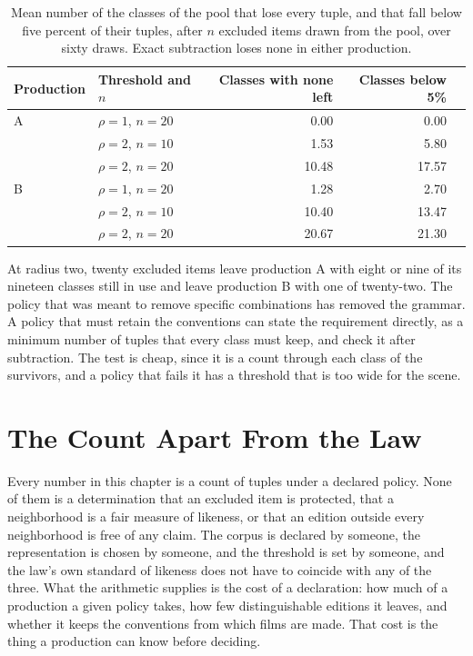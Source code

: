 \documentclass[11pt,twoside,openright]{book}
\theoremstyle{plain}
\theoremstyle{definition}
\theoremstyle{remark}
\begin{document}
\begin{table}[ht]
\centering
\begin{tabular}{@{}llrrr@{}}
\toprule
Production & Threshold and $n$ & Classes with none left & Classes below 5\%\\
\midrule
A & $\rho=1$, $n=20$ & 0.00 & 0.00\\
 & $\rho=2$, $n=10$ & 1.53 & 5.80\\
 & $\rho=2$, $n=20$ & 10.48 & 17.57\\
\midrule
B & $\rho=1$, $n=20$ & 1.28 & 2.70\\
 & $\rho=2$, $n=10$ & 10.40 & 13.47\\
 & $\rho=2$, $n=20$ & 20.67 & 21.30\\
\bottomrule
\end{tabular}
\caption{Mean number of the classes of the pool that lose every tuple, and that fall below five percent of their tuples, after $n$ excluded items drawn from the pool, over sixty draws. Exact subtraction loses none in either production.}\label{tab:gram15}
\end{table}

At radius two, twenty excluded items leave production A with eight or nine of its nineteen classes still in use and leave production B with one of twenty-two. The policy that was meant to remove specific combinations has removed the grammar. A policy that must retain the conventions can state the requirement directly, as a minimum number of tuples that every class must keep, and check it after subtraction. The test is cheap, since it is a count through each class of the survivors, and a policy that fails it has a threshold that is too wide for the scene.

\section{The Count Apart From the Law}\label{sec:law15}

Every number in this chapter is a count of tuples under a declared policy. None of them is a determination that an excluded item is protected, that a neighborhood is a fair measure of likeness, or that an edition outside every neighborhood is free of any claim. The corpus is declared by someone, the representation is chosen by someone, and the threshold is set by someone, and the law's own standard of likeness does not have to coincide with any of the three. What the arithmetic supplies is the cost of a declaration: how much of a production a given policy takes, how few distinguishable editions it leaves, and whether it keeps the conventions from which films are made. That cost is the thing a production can know before deciding.
\end{document}
